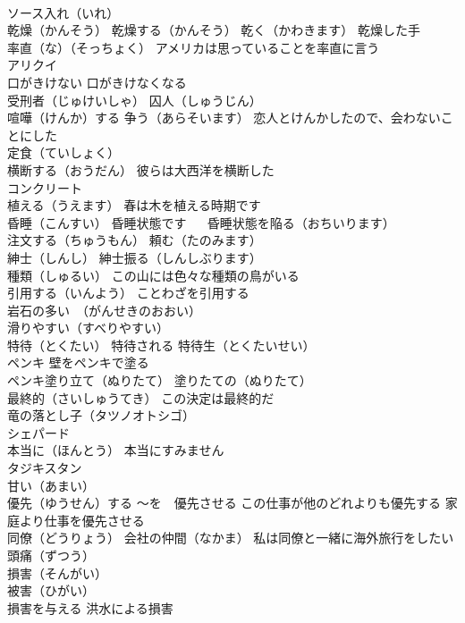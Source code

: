 \documentclass[8pt]{extreport}
\begin{document}
\begin{CJK}{UTF8}{min}
\\	ソース入れ（いれ）
\\	乾燥（かんそう） 乾燥する（かんそう） 乾く（かわきます） 乾燥した手
\\	率直（な）（そっちょく） アメリカは思っていることを率直に言う
\\	アリクイ
\\	口がきけない 口がきけなくなる
\\	受刑者（じゅけいしゃ） 囚人（しゅうじん）
\\	喧嘩（けんか）する 争う（あらそいます） 恋人とけんかしたので、会わないことにした
\\	定食（ていしょく）
\\	横断する（おうだん） 彼らは大西洋を横断した
\\	コンクリート
\\	植える（うえます） 春は木を植える時期です
\\	昏睡（こんすい） 昏睡状態です 　 昏睡状態を陥る（おちいります）
\\	注文する（ちゅうもん） 頼む（たのみます）
\\	紳士（しんし） 紳士振る（しんしぶります）
\\	種類（しゅるい） この山には色々な種類の鳥がいる
\\	引用する（いんよう） ことわざを引用する
\\	岩石の多い　（がんせきのおおい）
\\	滑りやすい（すべりやすい）
\\	特待（とくたい） 特待される 特待生（とくたいせい）
\\	ペンキ 壁をペンキで塗る
\\	ペンキ塗り立て（ぬりたて） 塗りたての（ぬりたて）
\\	最終的（さいしゅうてき） この決定は最終的だ
\\	竜の落とし子（タツノオトシゴ）
\\	シェパード
\\	本当に（ほんとう） 本当にすみません
\\	タジキスタン
\\	甘い（あまい）
\\	優先（ゆうせん）する ～を　優先させる この仕事が他のどれよりも優先する 家庭より仕事を優先させる
\\	同僚（どうりょう） 会社の仲間（なかま） 私は同僚と一緒に海外旅行をしたい
\\	頭痛（ずつう）
\\	損害（そんがい）
\\	被害（ひがい）　
\\	損害を与える 洪水による損害

\end{CJK}
\end{document}
